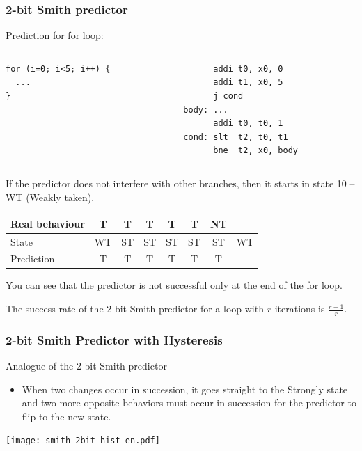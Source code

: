 \documentclass{beamer}
\begin{document}
\begin{frame}[fragile]
\frametitle{2-bit Smith predictor}

Prediction for for loop:

\begin{columns}[T]
\begin{column}{0.35\textwidth}
\begin{verbatim}
for (i=0; i<5; i++) {
  ...
}
\end{verbatim}
\end{column}
\hfill
\begin{column}{0.45\textwidth}
\begin{verbatim}
      addi t0, x0, 0
      addi t1, x0, 5
      j cond
body: ...
      addi t0, t0, 1
cond: slt  t2, t0, t1
      bne  t2, x0, body
\end{verbatim}
\end{column}
\end{columns}
\bigskip
\small
If the predictor does not interfere with other branches, then it starts in state 10 -- WT (Weakly taken).

\begin{tabular}{|l|c|c|c|c|c|c|c|}\hline
Real behaviour & T & T & T & T & T & NT & \\ \hline
State & WT & ST & ST & ST & ST & ST & WT\\ \hline
Prediction & T & T & T & T & T & {\color{red}T} &\\\hline
\end{tabular}

You can see that the predictor is not successful only at the end of the for loop.

The success rate of the 2-bit Smith predictor for a loop with $r$ iterations is $\frac{r-1}{r}$.
\end{frame}


\begin{frame}
\frametitle{2-bit Smith Predictor with Hysteresis}

Analogue of the 2-bit Smith predictor
\begin{itemize}
\item When two changes occur in succession, it goes straight to the Strongly state and two more opposite behaviors must occur in succession for the predictor to flip to the new state.
\end{itemize}

\begin{center}
\texttt{[image: smith\_2bit\_hist-en.pdf]}
\end{center}
\end{frame}
\end{document}
